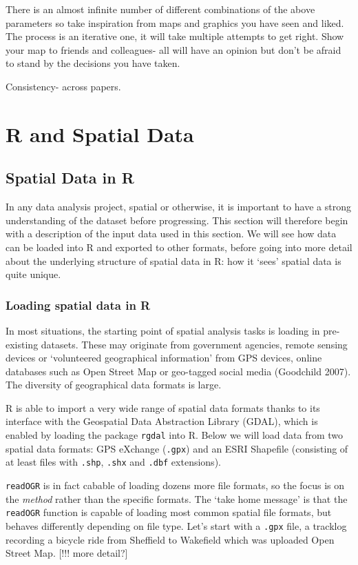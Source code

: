 \documentclass[]{article}
\begin{document}
There is an almost infinite number of different combinations of the
above parameters so take inspiration from maps and graphics you have
seen and liked. The process is an iterative one, it will take multiple
attempts to get right. Show your map to friends and colleagues- all will
have an opinion but don't be afraid to stand by the decisions you have
taken.

Consistency- across papers.

\section{R and Spatial Data}

\subsection{Spatial Data in R}

In any data analysis project, spatial or otherwise, it is important to
have a strong understanding of the dataset before progressing. This
section will therefore begin with a description of the input data used
in this section. We will see how data can be loaded into R and exported
to other formats, before going into more detail about the underlying
structure of spatial data in R: how it `sees' spatial data is quite
unique.

\subsubsection{Loading spatial data in R}

In most situations, the starting point of spatial analysis tasks is
loading in pre-existing datasets. These may originate from government
agencies, remote sensing devices or `volunteered geographical
information' from GPS devices, online databases such as Open Street Map
or geo-tagged social media (Goodchild 2007). The diversity of
geographical data formats is large.

R is able to import a very wide range of spatial data formats thanks to
its interface with the Geospatial Data Abstraction Library (GDAL), which
is enabled by loading the package \texttt{rgdal} into R. Below we will
load data from two spatial data formats: GPS eXchange (\texttt{.gpx})
and an ESRI Shapefile (consisting of at least files with \texttt{.shp},
\texttt{.shx} and \texttt{.dbf} extensions).

\texttt{readOGR} is in fact cabable of loading dozens more file formats,
so the focus is on the \emph{method} rather than the specific formats.
The `take home message' is that the \texttt{readOGR} function is capable
of loading most common spatial file formats, but behaves differently
depending on file type. Let's start with a \texttt{.gpx} file, a
tracklog recording a bicycle ride from Sheffield to Wakefield which was
uploaded Open Street Map. {[}!!! more detail?{]}
\end{document}
